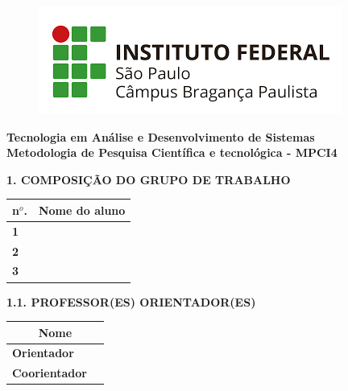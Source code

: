 \documentclass[
	hidelinks,
	12pt,				%
	openright,			%
	oneside,			%
	a4paper,			%
	english,			%
	french,				%
	spanish,			%
	brazil,				%
]{abntex2}
\newcommand{\imprimirorient}{\oorient}
\newcommand{\imprimircoorient}{\ocoorient}
\newcommand{\imprimirautorA}{\oautorA}
\newcommand{\imprimirprontuarioA}{\oprontuarioA}
\newcommand{\imprimirautorB}{\oautorB}
\newcommand{\imprimirprontuarioB}{\oprontuarioB}
\newcommand{\imprimirautorC}{\oautorC}
\newcommand{\imprimirprontuarioC}{\oprontuarioC}
\begin{document}
\thispagestyle{empty} %
\textual

\begin{figure}
\includegraphics[scale=.35]{imagens/IFSP-BRA.png} 
\end{figure}

\centering
\footnotesize\textbf{Tecnologia em Análise e Desenvolvimento de Sistemas} \\	\footnotesize\textbf{Metodologia de Pesquisa Científica e tecnológica - MPCI4}\\

\begin{center}
\vspace{1cm}
    \normalsize \textbf{\imprimirtitulo}
\end{center}
			
\begin{flushleft}
    \small \textbf{1. COMPOSIÇÃO DO GRUPO DE TRABALHO}
\end{flushleft}
\begin{center}
	\begin{tabular}{|m{0.5cm}|m{4cm}|m{10cm}|}
		\hline 
	    \textbf{n$^o$.} & \multicolumn{2}{c|}{\textbf{Nome do aluno}} \\
		\hline
		\textbf{1} & \textit{\imprimirprontuarioA} & \textit{\imprimirautorA}\\
		\hline
		\textbf{2} & \textit{\imprimirprontuarioB} & \textit{\imprimirautorB}\\
		\hline
		\textbf{3} & \textit{\imprimirprontuarioC} & \textit{\imprimirautorC}\\
		\hline
	\end{tabular}
\end{center}
	
\begin{flushleft}
   \small \textbf{1.1. PROFESSOR(ES) ORIENTADOR(ES) }
\end{flushleft}

\begin{center}
	\begin{tabular}{|m{5cm}|m{10cm}|}
	    \hline 
	    \multicolumn{2}{|c|}{\textbf{Nome}} \\
		\hline
		\textbf{Orientador} & \textit{\imprimirorient} \\
		\hline
		\textbf{Coorientador} & \textit{\imprimircoorient} \\
		\hline
	\end{tabular}
\end{center}
\end{document}
